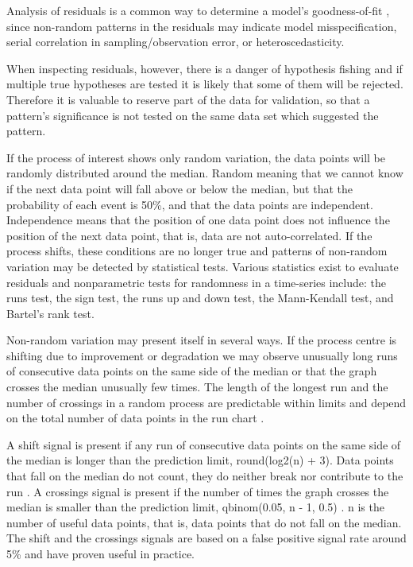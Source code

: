 Analysis of residuals is a common way to determine a model’s goodness-of-fit \citep{Cox1968general}, since  non-random patterns in the residuals may indicate model misspecification, serial correlation in sampling/observation error, or heteroscedasticity. 

When inspecting residuals, however, there is a danger of hypothesis fishing and if multiple true hypotheses are tested it is likely that some of them will be rejected. Therefore it is valuable to reserve part of the data for validation, so that a pattern’s significance is not tested on the same data set which suggested the pattern.


If the process of interest shows only random variation, the data points will be randomly distributed around the median. Random meaning that we cannot know if the next data point will fall above or below the median, but that the probability of each event is 50\%, and that the data points are independent. Independence means that the position of one data point does not influence the position of the next data point, that is, data are not auto-correlated. If the process shifts, these conditions are no longer true and patterns of non-random variation may be detected by statistical tests. Various statistics exist to evaluate residuals and nonparametric tests for randomness in a time-series include: the runs test, the sign test, the runs up and down test, the Mann-Kendall test, and Bartel’s rank test.

Non-random variation may present itself in several ways. If the process centre is shifting due to improvement or degradation we may observe unusually long runs of consecutive data points on the same side of the median or that the graph crosses the median unusually few times. The length of the longest run and the number of crossings in a random process are predictable within limits and depend on the total number of data points in the run chart \citep{anhoj2015diagnostic}.

A shift signal is present if any run of consecutive data points on the same side of the median is longer than the prediction limit, round(log2(n) + 3). Data points that fall on the median do not count, they do neither break nor contribute to the run \cite{schilling2012surprising}. A crossings signal is present if the number of times the graph crosses the median is smaller than the prediction limit, qbinom(0.05, n - 1, 0.5) \citep{chen2010impacts}. n is the number of useful data points, that is, data points that do not fall on the median. The shift and the crossings signals are based on a false positive signal rate around 5\% and have proven useful in practice.